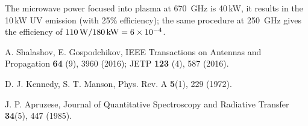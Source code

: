 \documentclass[aip, apl, amsmath,amssymb, reprint]{revtex4-1}
\begin{document}
\begin{thebibliography}{6}




The microwave power focused into plasma at 670~GHz is 40\,kW, it results in the 10\,kW UV emission (with 25\% efficiency); the same procedure at 250~GHz gives the efficiency of $110\,\rm{W}/180\,\rm{kW}=6\times10^{-4}$.

 A. Shalashov, E. Gospodchikov,  IEEE Transactions on Antennas and Propagation  \textbf{64} (9), 3960 (2016); JETP \textbf{123} (4), 587 (2016).

 D. J. Kennedy, S. T. Manson, Phys. Rev. A \textbf{5}(1), 229 (1972).

J. P. Apruzese,   Journal of Quantitative Spectroscopy and Radiative Transfer \textbf{34}(5), 447 (1985).


\end{thebibliography}
\end{document}
